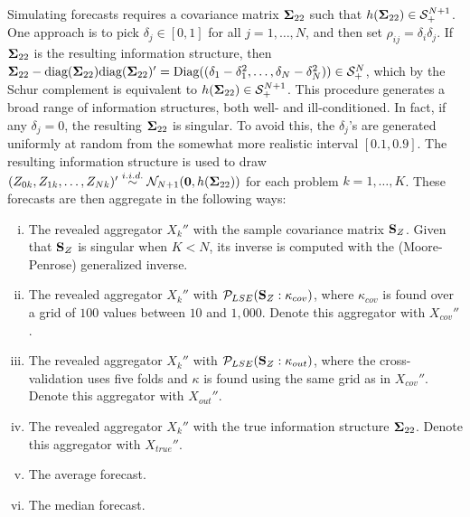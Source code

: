\documentclass[11pt]{article}
\newtheorem{proposition}[theorem]{Proposition}
\theoremstyle{definition}
\theoremstyle{definition}
\def\bSigma{{\bf \Sigma}}
\def\X{{\bf X}}
\def\Z{{\bf Z}}
\def\SS{{\bf S}}
\def\diag{\text{diag}}
\def\Diag{\text{Diag}}
\def\diag{\text{diag}}
\begin{document}
Simulating forecasts requires a covariance matrix $\bSigma_{22}$ such that $h(\bSigma_{22}) \in \mathcal{S}_{+}^{N+1}$. 
One approach is to pick $\delta_j \in [0,1]$ for all $j = 1, \dots, N$, and then set $\rho_{ij} = \delta_i \delta_j$. If  $\bSigma_{22}$ is the resulting information structure, then $\bSigma_{22} - \diag(\bSigma_{22})\diag(\bSigma_{22})' = \Diag((\delta_1 - \delta_1^2, \dots, \delta_N - \delta_N^2)) \in \mathcal{S}_{+}^{N}$, which by the Schur complement is equivalent to $h(\bSigma_{22}) \in \mathcal{S}_{+}^{N+1}$. 
This procedure generates a broad range of information structures, both well- and ill-conditioned. In fact, if any $\delta_j = 0$, the resulting $\bSigma_{22}$ is singular.  To avoid this, the $\delta_j$'s are generated uniformly at random from the somewhat more realistic interval $[0.1, 0.9]$. The resulting information structure is used to draw $(Z_{0k}, Z_{1k}, \dots, Z_{Nk})' \stackrel{i.i.d.}{\sim} \mathcal{N}_{N+1}(\boldsymbol{0}, h(\bSigma_{22}))$ for each problem $k = 1, \dots, K$. These forecasts are then aggregate in the following ways:
\begin{enumerate}[i)]
\item  The revealed aggregator  $X_k''$ with the sample covariance matrix $\SS_Z$. Given that $\SS_Z$ is singular when $K<N$, its inverse is computed with the (Moore-Penrose) generalized inverse.
\item The revealed aggregator $X_k''$ with $\mathcal{P}_{LSE}(\SS_Z : \kappa_{cov})$, where $\kappa_{cov}$ is found over a grid of $100$ values between $10$ and $1,000$. Denote this aggregator with $X_{cov}''$. 
\item The revealed aggregator  $X_k''$ with  $\mathcal{P}_{LSE}(\SS_Z : \kappa_{out})$,  
where the cross-validation uses five folds and $\kappa$ is found using the same grid as in $X_{cov}''$. Denote this aggregator with  $X_{out}''$. 
\item  The revealed aggregator  $X_k''$ with the true information structure $\bSigma_{22}$. Denote this aggregator with $X_{true}''$. 
\item The average forecast.
\item The median forecast.
\end{enumerate}
\end{document}
